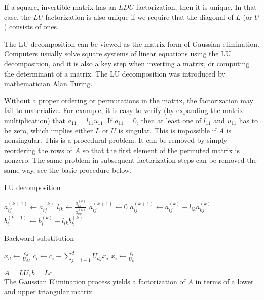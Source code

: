 If a square, invertible matrix has an $LDU$ factorization, then it is unique. 
In that case, the $LU$ factorization is also unique if we require that the 
diagonal of $L$ (or $U$ ) consists of ones.

The LU decomposition can be viewed as the matrix form of Gaussian elimination. 
Computers usually solve square systems of linear equations using the LU 
decomposition, and it is also a key step when inverting a matrix, or 
computing the determinant of a matrix. The LU decomposition was introduced
by mathematician Alan Turing.

Without a proper ordering or permutations in the matrix, 
the factorization may fail to materialize. For example, it is easy to verify 
(by expanding the matrix multiplication) that $a_{11} = l_{11} u_{11}$. 
If $a_{11} = 0$, then at least one of $l_{11}$ and $u_{11}$ has to be zero, 
which implies either $L$ or $U$ is singular. This is impossible if $A$ is 
nonsingular. This is a procedural problem. It can be removed by simply 
reordering the rows of $A$ so that the first element of the permuted matrix is 
nonzero. The same problem in subsequent factorization steps can be removed the 
same way, see the basic procedure below.

\begin{algorithm}
\caption{LU decomposition}
\label{alg:lu-decomposition} 
\begin{algorithmic}
	 
		 
			 
    			\LState $a_{ij}^{(k+1)} \gets a_{ij}^{(k)}$
    		\EndFor
    	\EndFor
	     
	    	\LState $l_{ik} \gets \frac{a_{ik}^{(k)}}{a_{kk}^{(k)}}$
	    	 
	    		\LState $a_{ij}^{(k + 1)} \gets 0$
	    	\EndFor
	    		\LState $a_{ij}^{(k+1)} \gets a_{ij}^{(k)} - l_{ik}a_{kj}^{(k)}$
	    	\EndFor
	    	\LState $b_i^{(k + 1)} \gets b_i^{(k)} - l_{ik}b_{k}^{(k)}$
	    \EndFor
    \EndFor
\end{algorithmic}
\end{algorithm}

\begin{algorithm}
\caption{Backward substitution}
\label{alg:backward-substitution} 
\begin{algorithmic}
	\State $x_d \gets \frac{c_d}{U_{dd}}$
		\LState $\tilde{c_i} \gets c_i - \sum_{j = i + 1}^{d} U_{dj}x_j$
		\LState $x_i \gets \frac{\tilde{c_i}}{U_{ii}}$
    \EndFor
\end{algorithmic}
\end{algorithm}

\begin{Theorem}
	$A = LU, b = Lc$ \\
	The Gaussian Elimination process yields a factorization of $A$ in terms of a
	lower and upper triangular matrix.
\end{Theorem}


